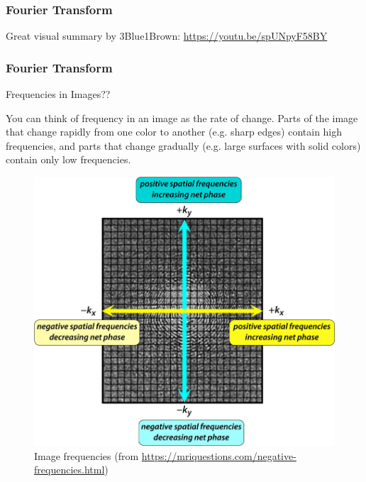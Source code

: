 \begin{frame}
    \frametitle{Fourier Transform}
    \begin{center}
    Great visual summary by 3Blue1Brown:
        \url{https://youtu.be/spUNpyF58BY}
    \end{center}
\end{frame}


\begin{frame}
    \frametitle{Fourier Transform}
    Frequencies in Images?? \newline

    \begin{center}
        You can think of frequency in an image as the rate of change. Parts of the image that change rapidly from one color to another (e.g. sharp edges) contain high frequencies, and parts that change gradually (e.g. large surfaces with solid colors) contain only low frequencies.
    \end{center}

     \begin{figure}[]
        \centering
        \includegraphics[height=0.5\textheight]{images/kspace.jpg}
        \caption{Image frequencies (from \url{https://mriquestions.com/negative-frequencies.html})}
    \end{figure}
\end{frame}






